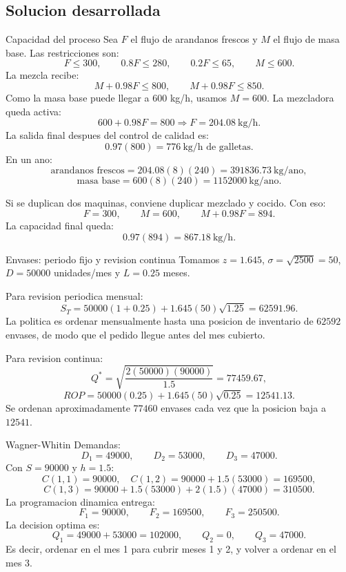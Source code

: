 \subsection{Solucion desarrollada}

\begin{respuesta}{Capacidad del proceso}
Sea \(F\) el flujo de arandanos frescos y \(M\) el flujo de masa base. Las restricciones son:
\[
F\le 300,\qquad 0.8F\le 280,\qquad 0.2F\le 65,\qquad M\le 600.
\]
La mezcla recibe:
\[
M+0.98F\le 800,
\qquad
M+0.98F\le 850.
\]
Como la masa base puede llegar a \(600\) kg/h, usamos \(M=600\). La mezcladora queda activa:
\[
600+0.98F=800
\Rightarrow F=204.08\ \text{kg/h}.
\]
La salida final despues del control de calidad es:
\[
0.97(800)=776\ \text{kg/h de galletas}.
\]
En un ano:
\[
\text{arandanos frescos}=204.08(8)(240)=391836.73\ \text{kg/ano},
\]
\[
\text{masa base}=600(8)(240)=1152000\ \text{kg/ano}.
\]

Si se duplican dos maquinas, conviene duplicar mezclado y cocido. Con eso:
\[
F=300,\qquad M=600,\qquad M+0.98F=894.
\]
La capacidad final queda:
\[
0.97(894)=867.18\ \text{kg/h}.
\]
\end{respuesta}

\begin{respuesta}{Envases: periodo fijo y revision continua}
Tomamos \(z=1.645\), \(\sigma=\sqrt{2500}=50\), \(D=50000\) unidades/mes y \(L=0.25\) meses.

Para revision periodica mensual:
\[
S_T=50000(1+0.25)+1.645(50)\sqrt{1.25}=62591.96.
\]
La politica es ordenar mensualmente hasta una posicion de inventario de \(62592\) envases, de modo que el pedido llegue antes del mes cubierto.

Para revision continua:
\[
Q^*=\sqrt{\frac{2(50000)(90000)}{1.5}}=77459.67,
\]
\[
ROP=50000(0.25)+1.645(50)\sqrt{0.25}=12541.13.
\]
Se ordenan aproximadamente \(77460\) envases cada vez que la posicion baja a \(12541\).
\end{respuesta}

\begin{respuesta}{Wagner-Whitin}
Demandas:
\[
D_1=49000,\qquad D_2=53000,\qquad D_3=47000.
\]
Con \(S=90000\) y \(h=1.5\):
\[
C(1,1)=90000,\quad C(1,2)=90000+1.5(53000)=169500,
\]
\[
C(1,3)=90000+1.5(53000)+2(1.5)(47000)=310500.
\]
La programacion dinamica entrega:
\[
F_1=90000,\qquad F_2=169500,\qquad F_3=250500.
\]
La decision optima es:
\[
Q_1=49000+53000=102000,\qquad Q_2=0,\qquad Q_3=47000.
\]
Es decir, ordenar en el mes 1 para cubrir meses 1 y 2, y volver a ordenar en el mes 3.
\end{respuesta}
